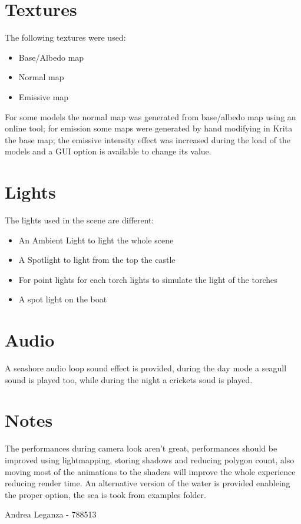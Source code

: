 \documentclass[10pt,a4paper]{article}
\begin{document}
\section{Textures}
The following textures were used:

\begin{itemize}
\item Base/Albedo map
\item Normal map
\item Emissive map
\end{itemize}

For some models the normal map was generated from base/albedo map using an online tool; for emission some maps were generated by hand modifying in Krita the base map; the emissive intensity effect was increased during the load of the models and a GUI option is available to change its value.

\section{Lights}
The lights used in the scene are different:

\begin{itemize}
\item An Ambient Light to light the whole scene
\item A Spotlight to light from the top the castle
\item For point lights for each torch lights to simulate the light of the torches
\item A spot light on the boat
\end{itemize}

\section{Audio}

A seashore audio loop sound effect is provided, during the day mode a seagull sound is played too, while during the night a crickets soud is played.

\section{Notes}

The performances during camera look aren't great, performances should be improved  using lightmapping, storing shadows and reducing polygon count, also moving most of  the animations to  the shaders will improve the  whole experience reducing render time. An alternative version of the water is provided enableing the proper option, the sea is took from examples folder.

\bigbreak
\bigbreak
Andrea Leganza - 788513
\end{document}
